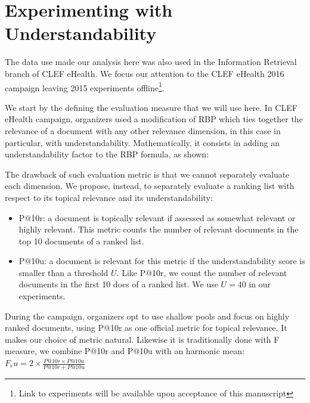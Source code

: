 %

%

\section{Experimenting with Understandability}
\label{sec:experiments}

The data use made our analysis here was also used in the Information Retrieval branch of CLEF eHealth.
We focus our attention to the CLEF eHealth 2016 campaign leaving 2015 experiments offline\footnote{Link to experiments will be available upon acceptance of this manuscript}.

We start by the defining the evaluation measure that we will use here. 
In CLEF eHealth campaign, organizers used a modification of RBP which ties together the relevance of a document with any other relevance dimension, in this case in particular, with understandability.
Mathematically, it consists in adding an understandability factor to the RBP formula, as shown:

The drawback of such evaluation metric is that we cannot separately evaluate each dimension. We propose, instead, to separately evaluate a ranking list with respect to its topical relevance and its understandability:
\begin{itemize}
        \item P@10r: a document is topically relevant if assessed as somewhat relevant or highly relevant. This metric counts the number of relevant documents in the top 10 documents of a ranked list.
        \item P@10u: a document is relevant for this metric if the understandability score is smaller than a threshold $U$. Like P@10r, we count the number of relevant documents in the first 10 docs of a ranked list. We use $U = 40$ in our experiments. 
\end{itemize}

During the campaign, organizers opt to use shallow pools and focus on highly ranked documents, using P@10r as one official metric for topical relevance.
It makes our choice of metric natural. Likewise it is traditionally done with F measure, we combine P@10r and P@10u with an harmonic mean: $F_ru = 2 \times \frac{P@10r \times P@10u}{P@10r + P@10u}$






